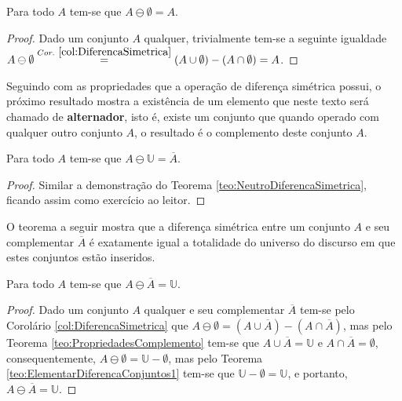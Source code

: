 \begin{teorema}\label{teo:NeutroDiferencaSimetrica}
	Para todo $A$ tem-se que $A \ominus \emptyset = A$.
\end{teorema}

\begin{proof}
	Dado um conjunto $A$ qualquer, trivialmente tem-se a seguinte igualdade $A \ominus \emptyset \stackrel{Cor. \ \ref{col:DiferencaSimetrica}}{=} (A \cup \emptyset) - (A \cap \emptyset) = A$.
\end{proof}

Seguindo com as propriedades que a operação de diferença simétrica possui, o próximo resultado mostra a existência de um elemento que neste texto será chamado de \textbf{alternador}, isto é, existe um conjunto que quando operado com qualquer outro conjunto $A$, o resultado é o complemento deste conjunto $A$.

\begin{teorema}\label{teo:InversorDiferencaSimetrica}
	Para todo $A$ tem-se que $A \ominus \mathbb{U} = \overline{A}$.
\end{teorema}

\begin{proof}
	Similar a demonstração do Teorema \ref{teo:NeutroDiferencaSimetrica}, ficando assim como exercício ao leitor.
\end{proof}

O teorema a seguir mostra que a diferença simétrica entre um conjunto $A$ e seu complementar $\overline{A}$ é exatamente igual a totalidade do universo do discurso em que estes conjuntos estão inseridos.

\begin{teorema}
  Para todo $A$ tem-se que $A \ominus \overline{A} = \mathbb{U}$.
\end{teorema}

\begin{proof}
	Dado um conjunto $A$ qualquer e seu complementar $\overline{A}$ tem-se pelo Corolário \ref{col:DiferencaSimetrica}  que 	$A \ominus \emptyset = (A \cup \overline{A}) - (A \cap \overline{A})$, mas pelo Teorema \ref{teo:PropriedadesComplemento} tem-se que $A \cup \overline{A} = \mathbb{U}$ e $A \cap \overline{A} = \emptyset$, consequentemente,  $A \ominus \emptyset = \mathbb{U} -  \emptyset$, mas pelo Teorema \ref{teo:ElementarDiferencaConjuntos1} tem-se que $\mathbb{U} -  \emptyset = \mathbb{U}$, e portanto, $A \ominus \overline{A} = \mathbb{U}$.
\end{proof}

